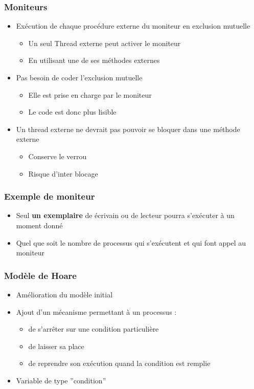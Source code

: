 \begin{frame}
\frametitle{Moniteurs}
\begin{itemize}
\item <1-> Exécution de chaque procédure externe du moniteur en exclusion mutuelle
\begin{itemize}
\item Un seul Thread externe peut activer le moniteur
\item En utilisant une de ses méthodes externes
\end{itemize}
\item <2-> Pas besoin de coder l’exclusion mutuelle
\begin{itemize}
\item Elle est prise en charge par le moniteur
\item Le code est donc plus lisible
\end{itemize}
\item <3-> Un thread externe ne devrait pas pouvoir se bloquer dans une méthode externe
\begin{itemize}
\item Conserve le verrou
\item Risque d'inter blocage
\end{itemize}
\end{itemize}
\end{frame}

\begin{frame}
\frametitle{Exemple de moniteur}

\begin{itemize}
\item Seul \textbf{un exemplaire} de écrivain ou de lecteur pourra s'exécuter à un moment donné
\item Quel que soit le nombre de processus qui s'exécutent et qui font appel au moniteur
\end{itemize}
\end{frame}

\begin{frame}
\frametitle{Modèle de Hoare}
\begin{itemize}
\item <1-> Amélioration du modèle initial
\item <2-> Ajout d'un mécanisme permettant à un processus :
\begin{itemize}
\item de s'arrêter sur une condition particulière
\item de laisser sa place
\item de reprendre son exécution quand la condition est remplie
\end{itemize}
\item <3-> Variable de type ''condition''
\end{itemize}
\end{frame}


